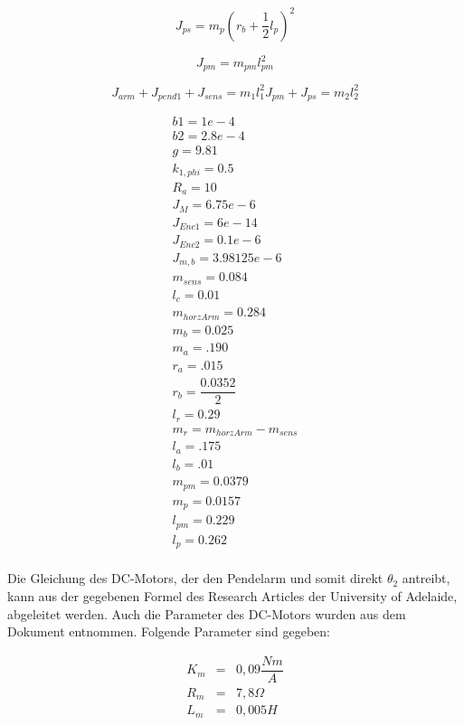 \begin{equation}
J_{ps}=m_p(r_b+\frac{1}{2}l_p)^2
\end{equation}

\begin{equation}
J_{pm}=m_{pm}l^2_{pm}
\end{equation}

\begin{equation}
J_{arm}+J_{pend1}+J_{sens}=m_1l^2_1J_{pm}+J_{ps}=m_2l^2_2
\end{equation}


\begin{eqnarray}
b1=1e-4 \\
b2=2.8e-4 \\
g=9.81\\
k_{1,phi}=0.5\\
R_a=10\\
J_M = 6.75e-6  \\        %
J_{Enc1} = 6e-14 \\        %
J_{Enc2} = 0.1e-6  \\     %
J_{m,b} = 3.98125e-6 \\     %
m_{sens} = 0.084  \\
l_c = 0.01 \\
m_{horzArm}=0.284 \\
m_b=0.025 \\
m_a=.190 \\
r_a=.015 \\
r_b=\dfrac{0.0352}{2}\\
l_r=0.29\\
m_r = m_{horzArm} - m_{sens}\\
l_a=.175\\
l_b=.01\\
m_{pm}=0.0379\\
m_p=0.0157\\
l_{pm}=0.229\\
l_p=0.262\\
\end{eqnarray}


Die Gleichung des DC-Motors, der den Pendelarm und somit direkt $\theta_2$ antreibt, kann aus der gegebenen Formel des Research Articles der University of Adelaide, abgeleitet werden.\cite{Cazzolato.2011}
Auch die Parameter des DC-Motors wurden aus dem Dokument entnommen. Folgende Parameter sind gegeben:

\begin{eqnarray}
K_m &=& 0,09  \dfrac{Nm}{A} \\
R_m &=& 7,8  \Omega \\
L_m &=& 0,005  H \\
\end{eqnarray}